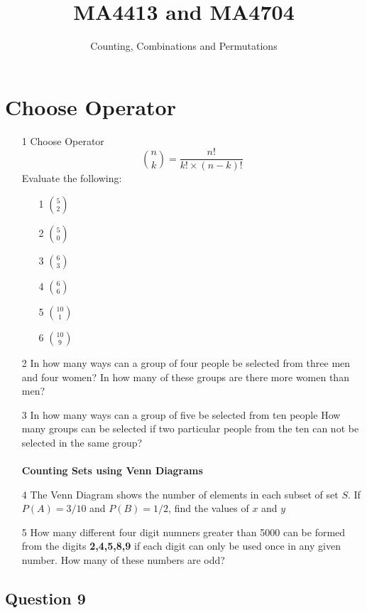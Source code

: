 \documentclass[12pt]{article}
\title{MA4413 and MA4704}
\author{Counting, Combinations and Permutations}
\begin{document}
\section{Choose Operator}
\begin{itemize}


\item[1] Choose Operator
\[ {n \choose k} = \frac{n!}{k! \times (n-k)!} \]
Evaluate the following:
\begin{multicols}{3}
    \begin{enumerate}
    \item[1] ${5 \choose 2}$
    \item[2] ${5 \choose 0}$
    \item[3] ${6 \choose 3}$
    \item[4] ${6 \choose 6}$
    \item[5] ${10 \choose 1}$
    \item[6] ${10 \choose 9}$
    \end{enumerate}        
  \end{multicols}
\item[2] In how many ways can a group of four people be selected from three men and four women?
In how many of these groups are there more women than men?
\item[3] In how many ways can a group of five be selected from ten people
How many groups can be selected if two particular people from the ten can not be selected in the same group?\\
\\
\textbf{Counting Sets using Venn Diagrams}
\item[4] 
The Venn Diagram shows the number of elements in each subset of set $S$.
If $P(A) = 3/10$ and $P(B) = 1/2$, find the values of $x$ and $y$

\item[5] How many different four digit numners greater than 5000 can be formed from the digits \textbf{2,4,5,8,9} if each digit can only be used once in any given number. How many of these numbers are odd?
\end{itemize}


\subsection*{Question 9} %
\end{document}
